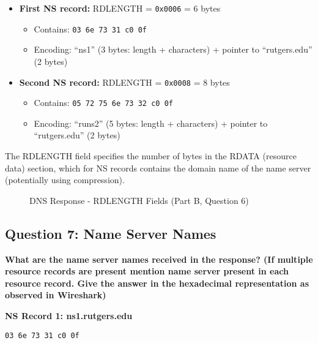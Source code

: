 \documentclass[11pt,letterpaper]{article}
\begin{document}
\begin{itemize}
    \item \textbf{First NS record:} RDLENGTH = \texttt{0x0006} = 6 bytes
    \begin{itemize}
        \item Contains: \texttt{03 6e 73 31 c0 0f}
        \item Encoding: ``ns1'' (3 bytes: length + characters) + pointer to ``rutgers.edu'' (2 bytes)
    \end{itemize}
    
    \item \textbf{Second NS record:} RDLENGTH = \texttt{0x0008} = 8 bytes
    \begin{itemize}
        \item Contains: \texttt{05 72 75 6e 73 32 c0 0f}
        \item Encoding: ``runs2'' (5 bytes: length + characters) + pointer to ``rutgers.edu'' (2 bytes)
    \end{itemize}
\end{itemize}

The RDLENGTH field specifies the number of bytes in the RDATA (resource data) section, which for NS records contains the domain name of the name server (potentially using compression).

\begin{figure}[h]
    \centering
    \caption{DNS Response - RDLENGTH Fields (Part B, Question 6)}
    \label{fig:partb_q6}
\end{figure}

\newpage

\subsection{Question 7: Name Server Names}

\textbf{What are the name server names received in the response? (If multiple resource records are present mention name server present in each resource record. Give the answer in the hexadecimal representation as observed in Wireshark)}

\textbf{NS Record 1: ns1.rutgers.edu}
\begin{hexbox}
\begin{lstlisting}[style=hexstyle]
03 6e 73 31 c0 0f
\end{lstlisting}
\end{hexbox}
\end{document}
